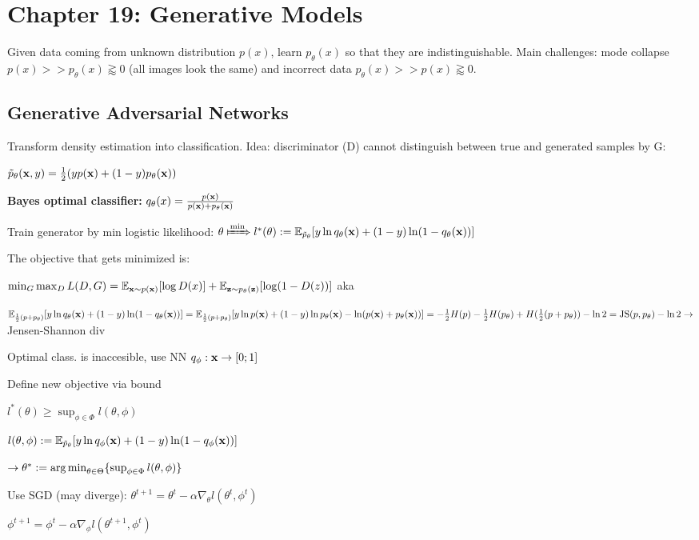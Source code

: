 \section*{Chapter 19: Generative Models}
Given data coming from unknown distribution $p(x)$, learn $p_\theta(x)$ so that they are indistinguishable. Main challenges: mode collapse $p(x) >> p_\theta(x) \gtrapprox 0$ (all images look the same) and incorrect data $p_\theta(x) >> p(x) \gtrapprox 0$.

\subsection*{Generative Adversarial Networks}
Transform density estimation into classification. Idea: discriminator (D) cannot distinguish between true and generated samples by G:

$\tilde p_\theta(\mathbf{x}, y) = \frac{1}{2}(yp(\mathbf{x}) + (1-y)p_\theta(\mathbf{x}))$

\textbf{Bayes optimal classifier:} $q_\theta(x) = \frac{p(\mathbf{x})}{p(\mathbf{x}) + p_\theta(\mathbf{x})}$

Train generator by min logistic likelihood: $\theta \xMapsto[]{\min} l^*(\theta) := \E_{\tilde p_\theta} [y\ln q_\theta(\x) + (1-y)\ln(1-q_\theta(\x))]$

The objective that gets minimized is:

$\min_G\max_D L(D, G) = \mathbb{E}_{\mathbf x \sim p(\mathbf x)}[\log D(x)] + \mathbb{E}_{\mathbf z \sim p_\theta(\mathbf z)}[\log (1-D(z))]$ aka

$\mathbb{E}_{\frac{1}{2}(p+p_\theta)}[y\ln q_\theta(\mathbf{x}) + (1-y)\ln (1-q_\theta(\mathbf{x}))] = \mathbb{E}_{\frac{1}{2}(p+p_\theta)}[y\ln p(\mathbf{x}) + (1-y)\ln p_\theta(\mathbf{x}) - \ln(p(\mathbf{x}) + p_\theta(\mathbf{x}))] = -\frac{1}{2}H(p) -\frac{1}{2}H(p_\theta) + H(\frac{1}{2}(p+p_\theta))-\ln 2 = \text{JS}(p, p_\theta) - \ln 2 \to$ Jensen-Shannon div

Optimal class. is inaccesible, use NN $q_\phi : \mathbf{x} \to [0; 1]$

Define new objective via bound

$l^*(\theta) \geq \sup_{\phi\in\Phi} l(\theta, \phi)$

$l(\theta, \phi) := \mathbb{E}_{\tilde p_\theta}[y\ln q_\phi(\mathbf{x}) + (1-y)\ln(1-q_\phi(\mathbf{x}))]$

$\to \theta^* := \operatorname*{arg\,min}_{\theta\in\Theta}\{\sup_{\phi\in\Phi}l(\theta, \phi)\}$

Use SGD (may diverge): $\theta^{t+1} = \theta^t - \alpha\nabla_\theta l(\theta^t, \phi^t)$

$\phi^{t+1} = \phi^t - \alpha\nabla_\phi l(\theta^{t+1}, \phi^t)$

